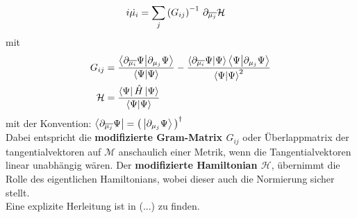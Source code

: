 \begin{align}\label{Bewegungsgleichung}
    i\dot{\mu_i} &= \sum_{j}\left(G_{ij}\right)^{-1}\thinspace \partial_{\overline{\mu_j}}\mathcal{H}
\end{align}
mit 
\begin{align}
    G_{ij} &= \frac{\bra{\partial_{\overline{\mu_i}}\Psi}\ket{\partial_{\mu_j}\Psi}}{\bra{\Psi}\ket{\Psi}} 
    - \frac{\bra{\partial_{\overline{\mu_i}}\Psi}\ket{\Psi}\bra{\Psi}\ket{\partial_{\mu_j}\Psi}}{\bra{\Psi}\ket{\Psi}^2} \\
    \mathcal{H} &= \frac{\bra{\Psi}\hat{H}\ket{\Psi}}{\bra{\Psi}\ket{\Psi}}
\end{align}
\noindent mit der Konvention: $\bra{\partial_{\overline{\mu_j}}\Psi} = \left(\thinspace\ket{\partial_{\mu_j}\Psi}\thinspace\right)^\dagger$\\
\noindent Dabei entspricht die \textbf{modifizierte Gram-Matrix $G_{ij}$} oder Überlappmatrix der tangentialvektoren auf $\mathcal{M}$ anschaulich einer
Metrik, wenn die Tangentialvektoren linear unabhängig wären. Der \textbf{modifizierte Hamiltonian $\mathcal{H}$}, übernimmt die Rolle des eigentlichen 
Hamiltonians, wobei dieser auch die Normierung sicher stellt. \\
Eine explizite Herleitung ist in (...) zu finden.

\newpage











